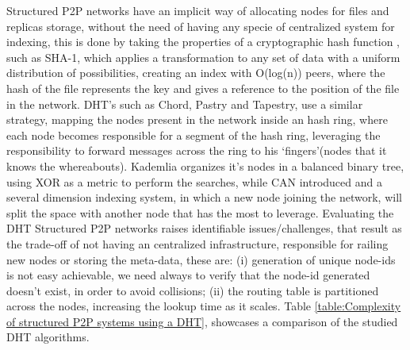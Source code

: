 \documentclass{./llncs2e/llncs}
\begin{document}
Structured P2P networks have an implicit way of allocating nodes for files and replicas storage, without the need of having any specie of centralized system for indexing, this is done by taking the properties of a cryptographic hash function \cite{Bakhtiari}\cite{Kargerl}\cite{Preneel1999}, such as SHA-1\cite{D.Eastlake3rdMotorola;P.JonesSystems2001}, which applies a transformation to any set of data with a uniform distribution of possibilities, creating an index with O(log(n)) peers, where the hash of the file represents the key and gives a reference to the position of the file in the network.
DHT's such as Chord\cite{Stoica2001}, Pastry\cite{Rowstron2001} and Tapestry\cite{Zhao2001}, use a similar strategy, mapping the nodes present in the network inside an hash ring, where each node becomes responsible for a segment of the hash ring, leveraging the responsibility to forward messages across the ring to his `fingers'(nodes that it knows the whereabouts). Kademlia\cite{Maymounkov} organizes it's nodes in a balanced binary tree, using XOR as a metric to perform the searches, while CAN\cite{Handley} introduced and a several dimension indexing system, in which a new node joining the network, will split the space with another node that has the most to leverage.
Evaluating the DHT Structured P2P networks raises identifiable issues/challenges, that result as the trade-off of not having an centralized infrastructure, responsible for railing new nodes or storing the meta-data, these are: (i) generation of unique node-ids is not easy achievable, we need always to verify that the node-id generated doesn't exist, in order to avoid collisions; (ii) the routing table is partitioned across the nodes, increasing the lookup time as it scales.
Table \ref{table:Complexity of structured P2P systems using a DHT}, showcases a comparison of the studied DHT algorithms.
\end{document}
